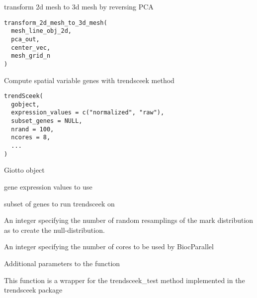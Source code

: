 \documentclass[a4paper]{book}
\begin{document}
%
\begin{Description}\relax
transform 2d mesh to 3d mesh by reversing PCA
\end{Description}
%
\begin{Usage}
\begin{verbatim}
transform_2d_mesh_to_3d_mesh(
  mesh_line_obj_2d,
  pca_out,
  center_vec,
  mesh_grid_n
)
\end{verbatim}
\end{Usage}
%
\begin{Description}\relax
Compute spatial variable genes with trendsceek method
\end{Description}
%
\begin{Usage}
\begin{verbatim}
trendSceek(
  gobject,
  expression_values = c("normalized", "raw"),
  subset_genes = NULL,
  nrand = 100,
  ncores = 8,
  ...
)
\end{verbatim}
\end{Usage}
%
\begin{Arguments}
\begin{ldescription}
\item[\code{gobject}] Giotto object

\item[\code{expression\_values}] gene expression values to use

\item[\code{subset\_genes}] subset of genes to run trendsceek on

\item[\code{nrand}] An integer specifying the number of random resamplings of the mark distribution as to create the null-distribution.

\item[\code{ncores}] An integer specifying the number of cores to be used by BiocParallel

\item[\code{...}] Additional parameters to the  function
\end{ldescription}
\end{Arguments}
%
\begin{Details}\relax
This function is a wrapper for the trendsceek\_test method implemented in the trendsceek package
\end{Details}
\end{document}
